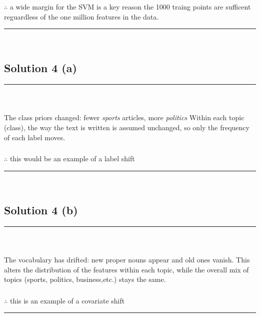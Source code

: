 \documentclass{article}
\begin{document}
\subsubsection*{\normalfont}{$\therefore$ a wide margin for the SVM is a key reason the 1000 traing points are sufficent reguardless of the one million features in the data.}

\noindent\rule{\textwidth}{0.4pt}\\

\newpage

\subsection*{Solution 4 (a)}
\noindent\rule{\textwidth}{0.4pt}\\

\subsubsection*{\normalfont}{The class priors changed: fewer \textit{sports} articles, more \textit{politics} Within each topic (class), the way the text is written is assumed unchanged, so only the frequency of each label moves.
}
\subsubsection*{\normalfont}{$\therefore$ this would be an example of a label shift}

\noindent\rule{\textwidth}{0.4pt}\\

\subsection*{Solution 4 (b)}
\noindent\rule{\textwidth}{0.4pt}\\

\subsubsection*{\normalfont}{The vocabulary has drifted: new proper nouns appear and old ones vanish. This alters the distribution of the features within each topic, while the overall mix of topics (sports, politics, business,etc.) stays the same.}

\subsubsection*{\normalfont}{$\therefore$ this is an example of a covariate shift}

\noindent\rule{\textwidth}{0.4pt}\\
\end{document}
